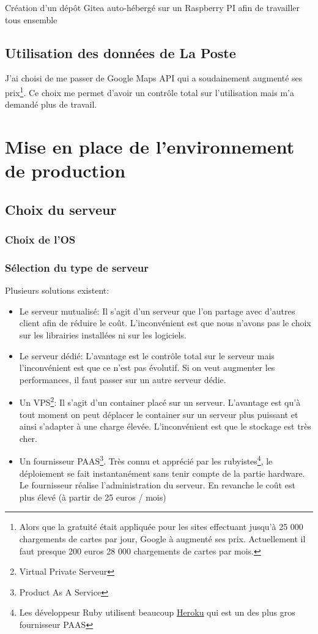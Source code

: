 \documentclass[]{report}
\begin{document}
    Création d'un dépôt Gitea auto-hébergé sur un Raspberry PI afin de travailler tous ensemble

  \section{Utilisation des données de La Poste}

    J'ai choisi  de me passer de Google Maps API qui a soudainement augmenté ses prix\footnote{Alors que la gratuité était appliquée pour les sites effectuant jusqu'à 25 000 chargements de cartes par jour, Google à augmenté ses prix. Actuellement il faut presque 200 euros 28 000 chargements de cartes par mois.}. Ce choix me permet d'avoir un contrôle total sur l'utilisation mais m'a demandé plus de travail.

\chapter{Mise en place de l’environnement de production}

  \section{Choix du serveur}

    \subsection{Choix de l'OS}

    \subsection{Sélection du type de serveur}

      Plusieurs solutions existent:

      \begin{itemize}
        \item Le serveur mutualisé: Il s’agit d’un serveur que l’on partage avec d’autres client afin de réduire le coût. L’inconvénient est que nous n’avons pas le choix sur les librairies installées ni sur les logiciels.
        \item Le serveur dédié: L’avantage est le contrôle total sur le serveur mais l’inconvénient est que ce n’est pas évolutif. Si on veut augmenter les performances, il faut passer sur un autre serveur dédie.
        \item Un VPS\footnote{Virtual Private Serveur}: Il s’agit d’un container placé sur un serveur. L’avantage est qu’à tout moment on peut déplacer le container sur un serveur plus puissant et ainsi s’adapter à une charge élevée. L’inconvénient est que le stockage est très cher.
        \item Un fournisseur PAAS\footnote{Product As A Service}. Très connu et apprécié par les rubyistes\footnote{Les développeur Ruby utilisent beaucoup  \href{https://www.heroku.com}{Heroku} qui est un des plus gros fournisseur PAAS}, le déploiement se fait instantanément sans tenir compte de la partie hardware.  Le fournisseur réalise l’administration du serveur. En revanche le coût est plus élevé (à partir de 25 euros / mois)
      \end{itemize}
\end{document}
